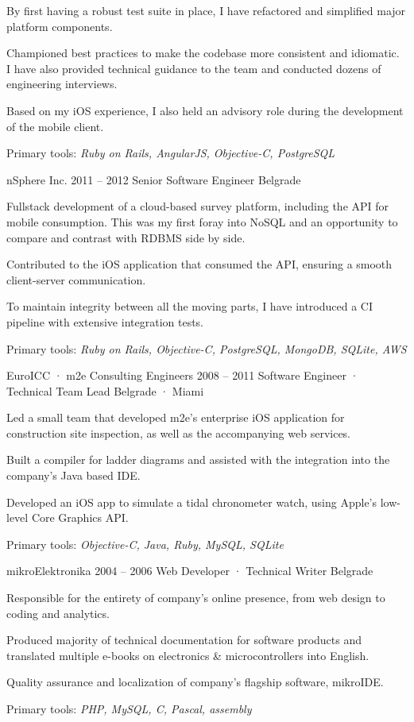 \documentclass[10pt]{article}
\begin{document}
{{\begin{newitemize}
		\item {By first having a robust test suite in place, I have refactored and simplified major platform components.}
		\item {Championed best practices to make the codebase more consistent and idiomatic. I have also provided technical guidance to the team and conducted dozens of engineering interviews.}
		\item {Based on my iOS experience, I also held an advisory role during the development of the mobile client.}
		\item {Primary tools: \emph{Ruby on Rails, AngularJS, Objective-C, PostgreSQL}}
		\end{newitemize}}
	\job
	{nSphere Inc.}
	{2011 – 2012}
	{Senior Software Engineer}
	{Belgrade}
	{\begin{newitemize}
		\item {Fullstack development of a cloud-based survey platform, including the API for mobile consumption. This was my first foray into NoSQL and an opportunity to compare and contrast with RDBMS side by side.}
		\item {Contributed to the iOS application that consumed the API, ensuring a smooth client-server communication.}
		\item {To maintain integrity between all the moving parts, I have introduced a CI pipeline with extensive integration tests.}
		\item {Primary tools: \emph{Ruby on Rails, Objective-C, PostgreSQL, MongoDB, SQLite, AWS}}
		\end{newitemize}}
	\job
	{EuroICC · m2e Consulting Engineers}
	{2008 – 2011}
	{Software Engineer · Technical Team Lead}
	{Belgrade · Miami}
	{\begin{newitemize}
		\item {Led a small team that developed m2e's enterprise iOS application for construction site inspection, as well as the accompanying web services.}
		\item {Built a compiler for ladder diagrams and assisted with the integration into the company's Java based IDE.}
		\item {Developed an iOS app to simulate a tidal chronometer watch, using Apple's low-level Core Graphics API.}
		\item {Primary tools: \emph{Objective-C, Java, Ruby, MySQL, SQLite}}
		\end{newitemize}}
	\job
	{mikroElektronika}
	{2004 – 2006}
	{Web Developer · Technical Writer}
	{Belgrade}
	{\begin{newitemize}
		\item {Responsible for the entirety of company's online presence, from web design to coding and analytics.}
		\item {Produced majority of technical documentation for software products and translated multiple e-books on electronics \& microcontrollers into English.}
		\item {Quality assurance and localization of company's flagship software, mikroIDE.}
		\item {Primary tools: \emph{PHP, MySQL, C, Pascal, assembly}}
		\end{newitemize}}
}
\end{document}
